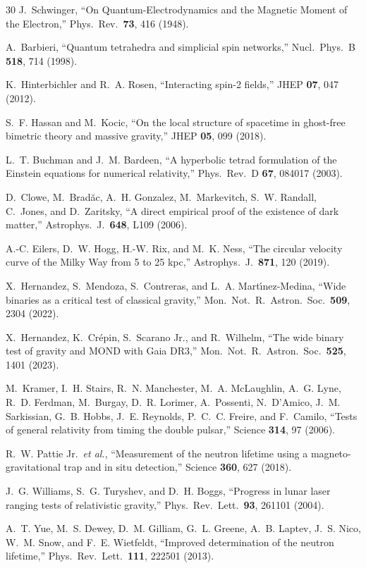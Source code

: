 \documentclass[aps,prd,preprint,superscriptaddress,showpacs,preprintnumbers,amsmath,amssymb,nofootinbib]{revtex4-2}
\begin{document}
\begin{thebibliography}{30}
J.~Schwinger, ``On Quantum-Electrodynamics and the Magnetic Moment of the Electron,'' Phys.\ Rev.\ \textbf{73}, 416 (1948).

A.~Barbieri, ``Quantum tetrahedra and simplicial spin networks,'' Nucl.\ Phys.\ B \textbf{518}, 714 (1998).

K.~Hinterbichler and R.~A. Rosen, ``Interacting spin-2 fields,'' JHEP \textbf{07}, 047 (2012).

S.~F. Hassan and M.~Kocic, ``On the local structure of spacetime in ghost-free bimetric theory and massive gravity,'' JHEP \textbf{05}, 099 (2018).

L.~T. Buchman and J.~M. Bardeen, ``A hyperbolic tetrad formulation of the Einstein equations for numerical relativity,'' Phys.\ Rev.\ D \textbf{67}, 084017 (2003).

D.~Clowe, M.~Brad\u{a}c, A.~H. Gonzalez, M.~Markevitch, S.~W. Randall, C.~Jones, and D.~Zaritsky, ``A direct empirical proof of the existence of dark matter,'' Astrophys.\ J.\ \textbf{648}, L109 (2006).

A.-C. Eilers, D.~W. Hogg, H.-W. Rix, and M.~K. Ness, ``The circular velocity curve of the Milky Way from 5 to 25 kpc,'' Astrophys.\ J.\ \textbf{871}, 120 (2019).

X.~Hernandez, S.~Mendoza, S.~Contreras, and L.~A. Mart\'{\i}nez-Medina, ``Wide binaries as a critical test of classical gravity,'' Mon.\ Not.\ R.\ Astron.\ Soc.\ \textbf{509}, 2304 (2022).

X.~Hernandez, K.~Cr\'epin, S.~Scarano Jr., and R.~Wilhelm, ``The wide binary test of gravity and MOND with Gaia DR3,'' Mon.\ Not.\ R.\ Astron.\ Soc.\ \textbf{525}, 1401 (2023).

M.~Kramer, I.~H. Stairs, R.~N. Manchester, M.~A. McLaughlin, A.~G. Lyne, R.~D. Ferdman, M.~Burgay, D.~R. Lorimer, A.~Possenti, N.~D'Amico, J.~M. Sarkissian, G.~B. Hobbs, J.~E. Reynolds, P.~C.~C. Freire, and F.~Camilo, ``Tests of general relativity from timing the double pulsar,'' Science \textbf{314}, 97 (2006).

R.~W. Pattie Jr.\ \textit{et al.}, ``Measurement of the neutron lifetime using a magneto-gravitational trap and in situ detection,'' Science \textbf{360}, 627 (2018).

J.~G. Williams, S.~G. Turyshev, and D.~H. Boggs, ``Progress in lunar laser ranging tests of relativistic gravity,'' Phys.\ Rev.\ Lett.\ \textbf{93}, 261101 (2004).

A.~T. Yue, M.~S. Dewey, D.~M. Gilliam, G.~L. Greene, A.~B. Laptev, J.~S. Nico, W.~M. Snow, and F.~E. Wietfeldt, ``Improved determination of the neutron lifetime,'' Phys.\ Rev.\ Lett.\ \textbf{111}, 222501 (2013).

\end{thebibliography}
\end{document}
